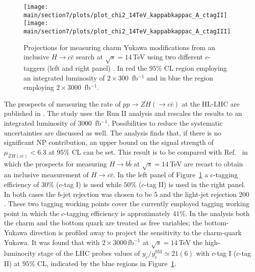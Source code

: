 \documentclass[../report.tex]{subfiles}
\providecommand{\main}{..}
\begin{document}
\begin{figure}[]
	\centering
	\texttt{[image: \\main/section7/plots/plot\_chi2\_14TeV\_kappabkappac\_A\_ctagII]}
	\texttt{[image: \\main/section7/plots/plot\_chi2\_14TeV\_kappabkappac\_A\_ctagIII]}
	\caption{Projections for measuring charm Yukawa modifications from an inclusive 
		$H\to c\bar c$ search at $\sqrt{s}=14$\,TeV using two different 
		$c$-taggers (left and right panel) \cite{Perez:2015lra}.
		In red the $95\%$ CL region employing an integrated luminosity 
		of $2\times 300$~fb$^{-1}$ and in blue the region 
		employing $2\times 3000$~fb$^{-1}$.
	\label{fig:inclusiveforecast}}
\end{figure}

The prospects of measuring 
the rate of $pp\to ZH(\to c\bar c)$ at the HL-LHC are published in  \cite{ATL-PHYS-PUB-2018-016}.
The study uses the Run II analysis \cite{Aaboud:2018fhh} and rescales the results 
to an integrated luminosity of $3000$~fb$^{-1}$.
Possibilities to reduce the systematic uncertainties are discussed as well.
The analysis finds that, if there is no significant NP contribution, 
an upper bound  on the signal strength 
 of $\mu_{ZH(c\bar c)} <6.3$ at $95\%$ CL can be set.
This result is to be compared with  Ref.~\cite{Perez:2015lra}
in which  the prospects for measuring $H\to b\bar b$ at $\sqrt{s}=14$\,TeV 
\cite{ATLAS-collaboration:2012iza} are recast 
 to obtain an inclusive measurement of $H\to c \bar c$.
In the left panel of Figure~\ref{fig:inclusiveforecast} a $c$-tagging efficiency of $30\%$ ($c$-tag I) is used while $50\%$ ($c$-tag II)  is used in the right panel. 
In both cases the $b$-jet rejection was chosen to be $5$ and the light-jet rejection
$200$.
These two tagging working points cover the currently employed tagging working point in which
the $c$-tagging efficiency is approximately $41\%$.
In the analysis both the charm and the bottom quark are treated as free variables;
the bottom-Yukawa direction is profiled away to project the sensitivity to the 
charm-quark Yukawa.
It was found that with $2\times 3000$\,fb$^{-1}$ at $\sqrt{s}=14$\,TeV the 
high-luminocity stage of the LHC probes values of $y_c/y_c^{\text{SM}}\simeq 21 (6)$ with
$c$-tag I ($c$-tag II)  at $95\%$ CL, indicated by the blue regions in Figure~\ref{fig:inclusiveforecast}.
\end{document}

